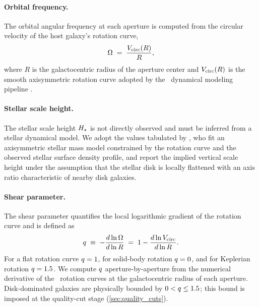 \paragraph{Orbital frequency.}
The orbital angular frequency at each aperture is computed from the
circular velocity of the host galaxy's rotation curve,
\begin{equation}
  \Omega \;=\; \frac{V_{\rm circ}(R)}{R},
\end{equation}
where $R$ is the galactocentric radius of the aperture center and
$V_{\rm circ}(R)$ is the smooth axisymmetric rotation curve adopted by the
\PHANGS\ dynamical modeling pipeline \citep{2025ApJ...989...66V}.

\paragraph{Stellar scale height.}
The stellar scale height $H_\star$ is not directly observed and must be
inferred from a stellar dynamical model. We adopt the values tabulated by
\citet{2025ApJ...989...66V}, who fit an axisymmetric stellar mass model
constrained by the rotation curve and the observed stellar surface density
profile, and report the implied vertical scale height under the assumption
that the stellar disk is locally flattened with an axis ratio
characteristic of nearby disk galaxies. 

\paragraph{Shear parameter.}
The shear parameter quantifies the local logarithmic gradient of the
rotation curve and is defined as
\begin{equation}
  q \;\equiv\; -\frac{d\ln \Omega}{d\ln R}
        \;=\; 1 - \frac{d\ln V_{\rm circ}}{d\ln R}.
  \label{eq:qshear}
\end{equation}
For a flat rotation curve $q = 1$, for solid-body rotation
$q = 0$, and for Keplerian rotation $q = 1.5$. We compute
$q$ aperture-by-aperture from the numerical derivative of the
\PHANGS\ rotation curves at the galactocentric radius of each aperture.
Disk-dominated galaxies are physically bounded by $0 < q \leq 1.5$;
this bound is imposed at the quality-cut stage (\autoref{sec:quality_cuts}).

